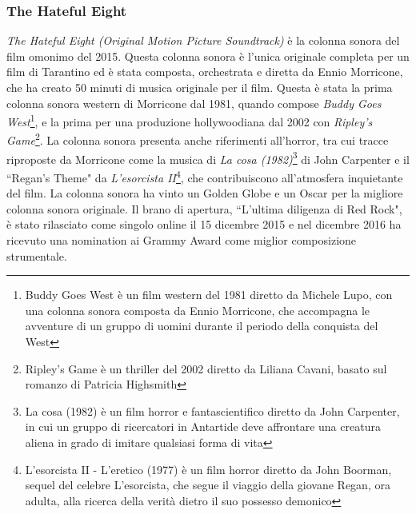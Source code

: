 \documentclass[12pt]{article} %
\begin{document}
                        \normalsize
                        \subsubsection*{The Hateful Eight}
                        \begin{flushleft}
                            \textit{The Hateful Eight (Original Motion Picture Soundtrack)} è la colonna sonora del film omonimo del 2015. Questa colonna sonora è l'unica originale completa per un film di Tarantino ed è stata composta, orchestrata e diretta da Ennio Morricone, che ha creato 50 minuti di musica originale per il film.
                            Questa è stata la prima colonna sonora western di Morricone dal 1981, quando compose \textit{Buddy Goes West}\footnote{Buddy Goes West è un film western del 1981 diretto da Michele Lupo, con una colonna sonora composta da Ennio Morricone, che accompagna le avventure di un gruppo di uomini durante il periodo della conquista del West}, e la prima per una produzione hollywoodiana dal 2002 con \textit{Ripley's Game}\footnote{Ripley's Game è un thriller del 2002 diretto da Liliana Cavani, basato sul romanzo di Patricia Highsmith}. 
                            La colonna sonora presenta anche riferimenti all'horror, tra cui tracce riproposte da Morricone come la musica di \textit{La cosa (1982)}\footnote{La cosa (1982) è un film horror e fantascientifico diretto da John Carpenter, in cui un gruppo di ricercatori in Antartide deve affrontare una creatura aliena in grado di imitare qualsiasi forma di vita} di John Carpenter e il ``Regan's Theme" da \textit{L'esorcista II}\footnote{L'esorcista II - L'eretico (1977) è un film horror diretto da John Boorman, sequel del celebre L'esorcista, che segue il viaggio della giovane Regan, ora adulta, alla ricerca della verità dietro il suo possesso demonico}, che contribuiscono all'atmosfera inquietante del film. 
                            La colonna sonora ha vinto un Golden Globe e un Oscar per la migliore colonna sonora originale. Il brano di apertura, ``L'ultima diligenza di Red Rock", è stato rilasciato come singolo online il 15 dicembre 2015 e nel dicembre 2016 ha ricevuto una nomination ai Grammy Award come miglior composizione strumentale.
                        \end{flushleft}
                            \small
\end{document}
